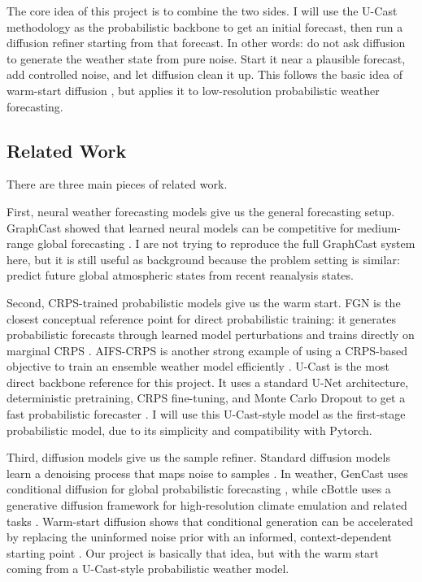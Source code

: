 \documentclass{article}
\begin{document}
The core idea of this project is to combine the two sides. I will use the U-Cast methodology as the probabilistic backbone to get an initial forecast, then run a diffusion refiner starting from that forecast. In other words: do not ask diffusion to generate the weather state from pure noise. Start it near a plausible forecast, add controlled noise, and let diffusion clean it up. This follows the basic idea of warm-start diffusion \citep{scholz2025warmstarts}, but applies it to low-resolution probabilistic weather forecasting.

\subsection{Related Work}

There are three main pieces of related work.

First, neural weather forecasting models give us the general forecasting setup. GraphCast showed that learned neural models can be competitive for medium-range global forecasting \citep{lam2023graphcast}. I are not trying to reproduce the full GraphCast system here, but it is still useful as background because the problem setting is similar: predict future global atmospheric states from recent reanalysis states.

Second, CRPS-trained probabilistic models give us the warm start. FGN is the closest conceptual reference point for direct probabilistic training: it generates probabilistic forecasts through learned model perturbations and trains directly on marginal CRPS \citep{alet2025fgn}. AIFS-CRPS is another strong example of using a CRPS-based objective to train an ensemble weather model efficiently \citep{lang2026aifscrps}. U-Cast is the most direct backbone reference for this project. It uses a standard U-Net architecture, deterministic pretraining, CRPS fine-tuning, and Monte Carlo Dropout to get a fast probabilistic forecaster \citep{cachay2026ucast}. I will use this U-Cast-style model as the first-stage probabilistic model, due to its simplicity and compatibility with Pytorch.

Third, diffusion models give us the sample refiner. Standard diffusion models learn a denoising process that maps noise to samples \citep{ho2020ddpm}. In weather, GenCast uses conditional diffusion for global probabilistic forecasting \citep{price2025gencast}, while cBottle uses a generative diffusion framework for high-resolution climate emulation and related tasks \citep{brenowitz2025cbottle}. Warm-start diffusion shows that conditional generation can be accelerated by replacing the uninformed noise prior with an informed, context-dependent starting point \citep{scholz2025warmstarts}. Our project is basically that idea, but with the warm start coming from a U-Cast-style probabilistic weather model.
\end{document}
